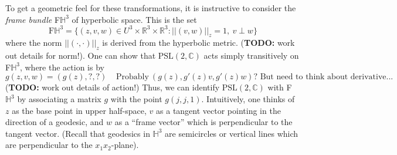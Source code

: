 \documentclass[]{article}
\begin{document}
To get a geometric feel for these transformations, it is instructive to consider the \textit{frame bundle} F$\mathbb{H}^3$ of hyperbolic space.
This is the set
$$
\text{F}\mathbb{H}^3 = \{ (z, v, w) \in U^3 \times \mathbb{R}^3 \times \mathbb{R}^3 : ||(v, w)||_z = 1, ~ v \perp w \}
$$
where the norm $||(\cdot, \cdot)||_z$ is derived from the hyperbolic metric.
(\textbf{TODO:} work out details for norm!).
One can show that $\text{PSL}(2, \mathbb{C})$ acts simply transitively on F$\mathbb{H}^3$, where the action is by
$$
g(z, v, w) = (g(z), \textbf{?}, \textbf{?}) ~~~~~ \text{Probably}~ (g(z), g'(z)v, g'(z)w)\text{? But need to think about derivative...}
$$
(\textbf{TODO:} work out details of action!)
Thus, we can identify $\text{PSL}(2, \mathbb{C})$ with F$\mathbb{H}^3$ by associating a matrix $g$ with the point $g(j, j, 1)$.
Intuitively, one thinks of $z$ as the base point in upper half-space, $v$ as a tangent vector pointing in the direction of a geodesic, and $w$ as a ``frame vector'' which is perpendicular to the tangent vector.
(Recall that geodesics in $\mathbb{H}^3$ are semicircles or vertical lines which are perpendicular to the $x_1x_2$-plane).
\end{document}
